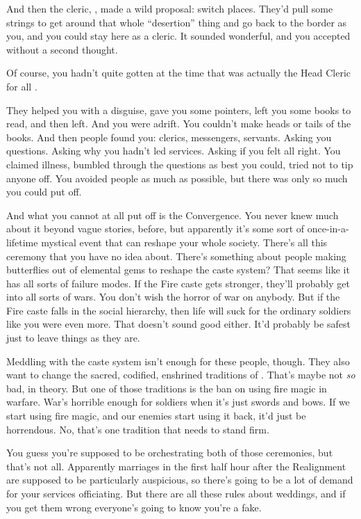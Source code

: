 \documentclass[char]{iron}
\begin{document}
And then the cleric, \cRealPriest{\real{\full}}, made a wild proposal:
switch places.  They'd pull some strings to get around that whole ``desertion''
thing and go back to the border as you, and you could stay here as a cleric.
It sounded wonderful, and you accepted without a second thought.

Of course, you hadn't quite gotten at the time that \cRealPriest{\real{\first}}
was actually the Head Cleric for all \sHomeCountry{}.

They helped you with a disguise, gave you some pointers, left you some
books to read, and then left.  And you were adrift.  You couldn't make
heads or tails of the books.  And then people found you: clerics,
messengers, servants.  Asking you questions.  Asking why you hadn't led
services.  Asking if you felt all right.  You claimed illness, bumbled through
the questions as best you could, tried not to tip anyone off.  You avoided
people as much as possible, but there was only so much you could put off.

And what you cannot at all put off is the Convergence.  You never knew
much about it beyond vague stories, before, but apparently it's some
sort of once-in-a-lifetime mystical event that can reshape your whole
society.  There's all this ceremony that you have no idea about.  There's
something about people making butterflies out of elemental gems to
reshape the caste system?  That seems like it has all sorts of failure modes.
If the Fire caste gets stronger, they'll probably get \sHomeCountry{}
into all sorts of wars.  You don't wish the horror of war on anybody.  But
if the Fire caste falls in the social hierarchy, then life will suck for
the ordinary soldiers like you were even more.  That doesn't sound good either.
It'd probably be safest just to leave things as they are.

Meddling with the caste system isn't enough for these people, though.
They also want to change the sacred, codified, enshrined traditions of
\sHomeCountry{}.  That's maybe not \emph{so} bad, in theory.  But one
of those traditions is the ban on using fire magic in warfare.  War's
horrible enough for soldiers when it's just swords and bows.  If we
start using fire magic, and our enemies start using it back, it'd just
be horrendous.  No, that's one tradition that needs to stand firm.

You guess you're supposed to be orchestrating both of those ceremonies,
but that's not all.  Apparently marriages in the first half hour after the
Realignment are supposed to be particularly auspicious, so there's going
to be a lot of demand for your services officiating.  But there are all
these rules about weddings, and if you get them wrong everyone's going
to know you're a fake.
\end{document}
